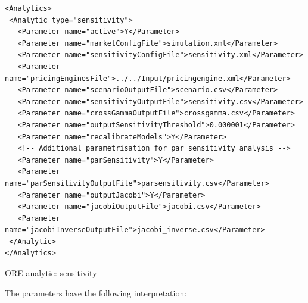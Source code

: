 \documentclass[12pt, a4paper]{article}
\begin{document}
\begin{listing}[H]
\begin{verbatim}
<Analytics>
 <Analytic type="sensitivity">
   <Parameter name="active">Y</Parameter>
   <Parameter name="marketConfigFile">simulation.xml</Parameter>
   <Parameter name="sensitivityConfigFile">sensitivity.xml</Parameter>
   <Parameter name="pricingEnginesFile">../../Input/pricingengine.xml</Parameter>
   <Parameter name="scenarioOutputFile">scenario.csv</Parameter>
   <Parameter name="sensitivityOutputFile">sensitivity.csv</Parameter>
   <Parameter name="crossGammaOutputFile">crossgamma.csv</Parameter>
   <Parameter name="outputSensitivityThreshold">0.000001</Parameter>
   <Parameter name="recalibrateModels">Y</Parameter>
   <!-- Additional parametrisation for par sensitivity analysis -->
   <Parameter name="parSensitivity">Y</Parameter>
   <Parameter name="parSensitivityOutputFile">parsensitivity.csv</Parameter>
   <Parameter name="outputJacobi">Y</Parameter>
   <Parameter name="jacobiOutputFile">jacobi.csv</Parameter>
   <Parameter name="jacobiInverseOutputFile">jacobi_inverse.csv</Parameter>
 </Analytic>
</Analytics>
\end{verbatim}
\caption{ORE analytic: sensitivity}
\label{lst:ore_sensitivity}
\end{listing}

The parameters have the following interpretation:
\end{document}
